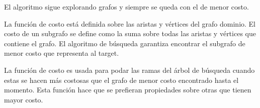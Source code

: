 El algoritmo sigue explorando grafos y siempre se queda con el de menor costo.

La funci\'on de costo est\'a definida sobre las aristas y v\'ertices del grafo dominio. El costo de un subgrafo se define como la suma sobre todas las aristas y v\'ertices que contiene el grafo.
El algoritmo de b\'usqueda garantiza encontrar el subgrafo de menor costo que representa al target.

La funci\'on de costo es usada para podar las ramas del \'arbol de b\'usqueda cuando estas se hacen m\'as costosas que el grafo de menor costo encontrado hasta el momento. Esta funci\'on hace que se prefieran propiedades sobre otras que tienen mayor costo.

%
%
%




